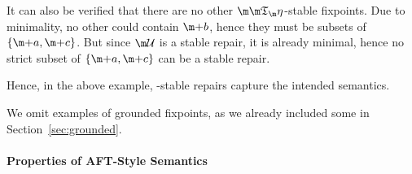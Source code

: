 \begin{example}
It can also be verified that there are no other $\Ap$-stable fixpoints. Due to minimality, no other could contain $\add b$, hence they must be subsets of $\{\add a,\add c\}$. But since $\UU$ is a stable repair, it is already minimal, hence no strict subset of $\{\add a,\add c\}$ can be a stable repair.
\end{example}

Hence, in the above example, \Ap-stable repairs capture the intended semantics.

We omit examples of grounded fixpoints, as we already included some in Section~\ref{sec:grounded}.

\paragraph{Properties of AFT-Style Semantics}%
% 


